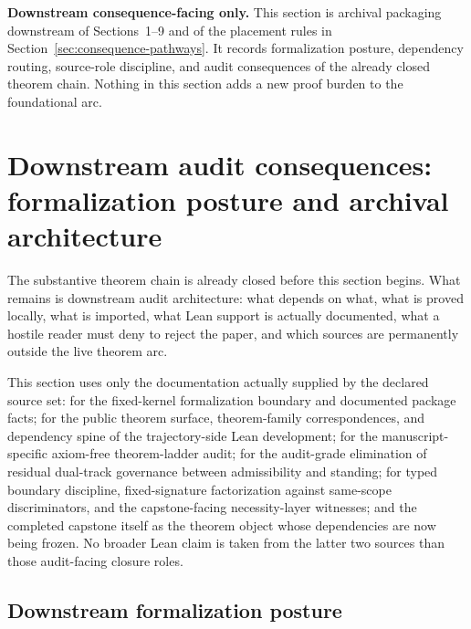 \begin{fixedbox}
\textbf{Downstream consequence-facing only.} This section is archival packaging downstream of Sections~1--9 and of the placement rules in Section~\ref{sec:consequence-pathways}. It records formalization posture, dependency routing, source-role discipline, and audit consequences of the already closed theorem chain. Nothing in this section adds a new proof burden to the foundational arc.
\end{fixedbox}

\section{Downstream audit consequences: formalization posture and archival architecture}
\label{sec:formalization-audit}

The substantive theorem chain is already closed before this section begins. What remains is downstream audit architecture: what depends on what, what is proved locally, what is imported, what Lean support is actually documented, what a hostile reader must deny to reject the paper, and which sources are permanently outside the live theorem arc.

\begin{importnote}
This section uses only the documentation actually supplied by the declared source set: \fcas{} for the fixed-kernel formalization boundary and documented package facts; \trajpaper{} for the public theorem surface, theorem-family correspondences, and dependency spine of the trajectory-side Lean development; \noninstgodeldoc{} for the manuscript-specific axiom-free theorem-ladder audit; \standeqdoc{} for the audit-grade elimination of residual dual-track governance between admissibility and standing; \exhaustiondoc{} for typed boundary discipline, fixed-signature factorization against same-scope discriminators, and the capstone-facing necessity-layer witnesses; and the completed capstone itself as the theorem object whose dependencies are now being frozen. No broader Lean claim is taken from the latter two sources than those audit-facing closure roles.
\end{importnote}

\subsection{Downstream formalization posture}

